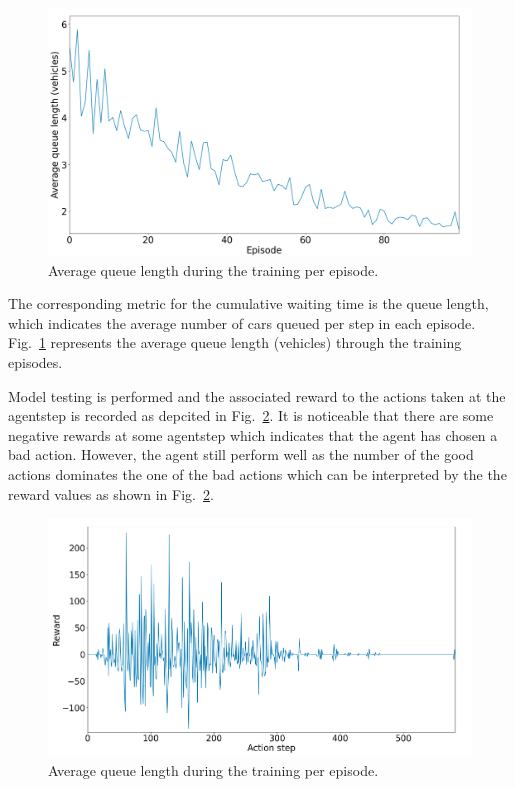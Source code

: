 \documentclass[conference]{IEEEtran}
\begin{document}
\begin{figure}[!ht]
    \centering
    \begin{center}
    \includegraphics[scale=0.24]{images/train_queue.png}
    \end{center}
    \caption{Average queue length during the training per episode.}
    \label{fig:12}
\end{figure}

The corresponding metric for the cumulative waiting time is the queue length, which indicates the average number of cars queued per step in each episode. Fig.~\ref{fig:12} represents the average queue length (vehicles) through the training episodes. 

Model testing is performed and the associated reward to the actions taken at the agentstep is recorded as depcited in Fig.~\ref{fig:13}. It is noticeable that there are some negative rewards at some agentstep which indicates that the agent has chosen a bad action. However, the agent still perform well as the number of the good actions dominates the one of the bad actions which can be interpreted by the the reward values as shown in Fig.~\ref{fig:13}.

\begin{figure}[H]
    \centering
    \begin{center}
    \includegraphics[scale=0.24]{images/test_reward.png}
    \end{center}
    \caption{Average queue length during the training per episode.}
    \label{fig:13}
\end{figure}
\end{document}
